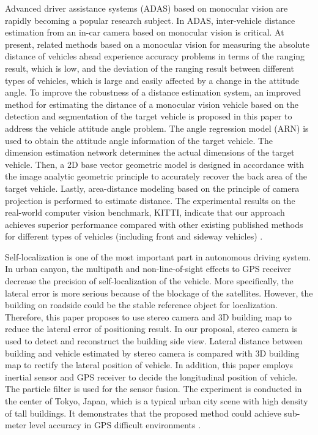 Advanced driver assistance systems (ADAS) based on monocular vision are rapidly becoming a popular research subject. In ADAS, inter-vehicle distance estimation from an in-car camera based on monocular vision is critical. At present, related methods based on a monocular vision for measuring the absolute distance of vehicles ahead experience accuracy problems in terms of the ranging result, which is low, and the deviation of the ranging result between different types of vehicles, which is large and easily affected by a change in the attitude angle. To improve the robustness of a distance estimation system, an improved method for estimating the distance of a monocular vision vehicle based on the detection and segmentation of the target vehicle is proposed in this paper to address the vehicle attitude angle problem. The angle regression model (ARN) is used to obtain the attitude angle information of the target vehicle. The dimension estimation network determines the actual dimensions of the target vehicle. Then, a 2D base vector geometric model is designed in accordance with the image analytic geometric principle to accurately recover the back area of the target vehicle. Lastly, area-distance modeling based on the principle of camera projection is performed to estimate distance. The experimental results on the real-world computer vision benchmark, KITTI, indicate that our approach achieves superior performance compared with other existing published methods for different types of vehicles (including front and sideway vehicles) \cite{Huang2019}.

Self-localization is one of the most important part in autonomous driving system. In urban canyon, the multipath and non-line-of-sight effects to GPS receiver decrease the precision of self-localization of the vehicle. More specifically, the lateral error is more serious because of the blockage of the satellites. However, the building on roadside could be the stable reference object for localization. Therefore, this paper proposes to use stereo camera and 3D building map to reduce the lateral error of positioning result. In our proposal, stereo camera is used to detect and reconstruct the building side view. Lateral distance between building and vehicle estimated by stereo camera is compared with 3D building map to rectify the lateral position of vehicle. In addition, this paper employs inertial sensor and GPS receiver to decide the longitudinal position of vehicle. The particle filter is used for the sensor fusion. The experiment is conducted in the center of Tokyo, Japan, which is a typical urban city scene with high density of tall buildings. It demonstrates that the proposed method could achieve sub-meter level accuracy in GPS difficult environments \cite{Bao2016}.

